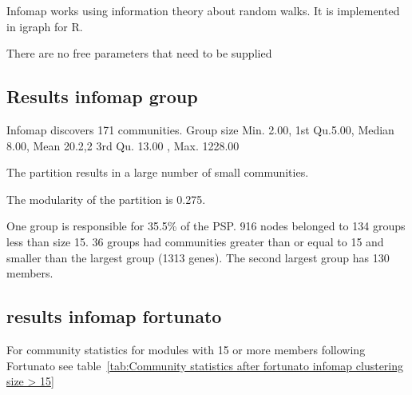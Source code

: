 Infomap works using information theory about random walks. It is implemented in igraph for R. 

There are no free parameters that need to be supplied

\subsection{Results infomap group}

Infomap discovers 171 communities. Group size  Min. 2.00, 1st  Qu.5.00,   Median 8.00,     Mean 20.2,2 3rd Qu. 13.00 ,  Max. 1228.00

The partition results in a large number of small communities. 

The modularity of the partition is 0.275.

One group is responsible for 35.5\% of the PSP. 916 nodes belonged to 134 groups less than size 15. 36 groups had communities greater than or equal to 15 and smaller than the largest group (1313 genes). The second largest group has 130 members.  
\subsection{results infomap fortunato}
For community statistics for modules with 15 or more members following Fortunato \cite{fortunato2016community} see table~\ref{tab:Community statistics after fortunato infomap clustering size > 15}

